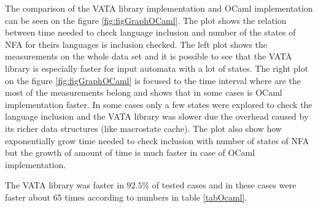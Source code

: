 The comparison of the VATA library implementation and OCaml implementation can be seen on the figure \ref{fig:figGraphOCaml}. 
The plot shows the relation between time needed to check language inclusion and number of the states of NFA for theirs languages is inclusion checked.
The left plot shows the measurements on the whole data set and it is possible to see that the VATA library is especially faster for input automata with a lot
of states. The right plot on the figure \ref{fig:figGraphOCaml} is focused to the time interval where are the most of the measurements belong and 
shows that in some cases is OCaml implementation faster. In some cases only a few states were explored to 
check the language inclusion and the VATA library was slower due the overhead caused by its richer data structures (like macrostate cache). The plot also show
how exponentially grow time needed to check inclusion with number of states of NFA but 
the growth of amount of time is much faster in case of OCaml implementation.

The VATA library was faster in $92.5\%$ of tested cases and in these cases were faster about 65 times according to numbers in table \ref{tabOcaml}.

